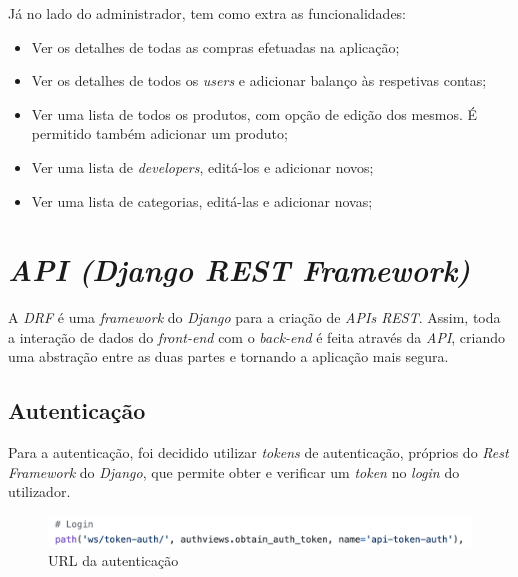 \documentclass[10pt,english]{article}
\begin{document}
\par Já no lado do administrador, tem como extra as funcionalidades:

\begin{itemize}
    \begin{itemize}
        \item Ver os detalhes de todas as compras efetuadas na aplicação;
        \item Ver os detalhes de todos os \textit{users} e adicionar balanço às respetivas contas;
        \item Ver uma lista de todos os produtos, com opção de edição dos mesmos. É permitido também adicionar um produto;
        \item Ver uma lista de \textit{developers}, editá-los e adicionar novos;
        \item Ver uma lista de categorias, editá-las e adicionar novas;
    \end{itemize}
\end{itemize}




\clearpage

\section{\textit{API (Django REST Framework)}}

\par A \textit{DRF} é uma \textit{framework} do \textit{Django} para a criação de \textit{APIs REST}. Assim, toda a interação de dados do \textit{front-end} com o \textit{back-end} é feita através da \textit{API}, criando uma abstração entre as duas partes e tornando a aplicação mais segura. 


\subsection{Autenticação}

\par Para a autenticação, foi decidido utilizar \textit{tokens} de autenticação, próprios do \textit{Rest} \textit{Framework} do \textit{Django}, que  permite obter e verificar um \textit{token} no \textit{login} do utilizador. 

\begin{figure}[!h]
        \centering
        \includegraphics[width=\textwidth]{images/authtoken.png}
        \caption{URL da autenticação}
\end{figure}
\end{document}
